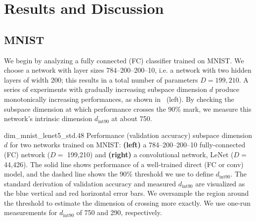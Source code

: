 \documentclass{article} %
\newcommand{\dintn}{d_{\mathrm{int90}}}
\begin{document}
\section{Results and Discussion}

\subsection{MNIST}

We begin by analyzing a fully connected (FC) classifier trained on MNIST. We choose a network with layer sizes \mbox{784--200--200--10}, i.e. a network with two hidden layers of width 200; this results in a total number of parameters $D=199,210$. A series of experiments with gradually increasing subspace dimension $d$ produce monotonically increasing performances, as shown in ~(left). By checking the subspace dimension at which performance crosses the 90\% mark, we measure this network's intrinsic dimension $\dintn$ at about 750.



{dim_mnist_lenet5_std}{.48}{
  Performance (validation accuracy) \vs subspace dimension $d$ for two networks trained on MNIST: 
  \textbf{(left)} a 784--200--200--10 fully-connected (FC) network ($D =$ 199,210) and \textbf{(right)} a convolutional network, LeNet ($D =$ 44,426). The solid line shows performance of a well-trained direct (FC or conv) model, and the dashed line shows the 90\% threshold we use to define $\dintn$. The standard derivation of validation accuracy and measured  $\dintn$ are visualized as the blue vertical and red horizontal error bars.
  We oversample the region around the threshold to estimate the dimension of crossing more exactly. We use one-run measurements for $\dintn$ of 750 and 290, respectively.
}
\end{document}
